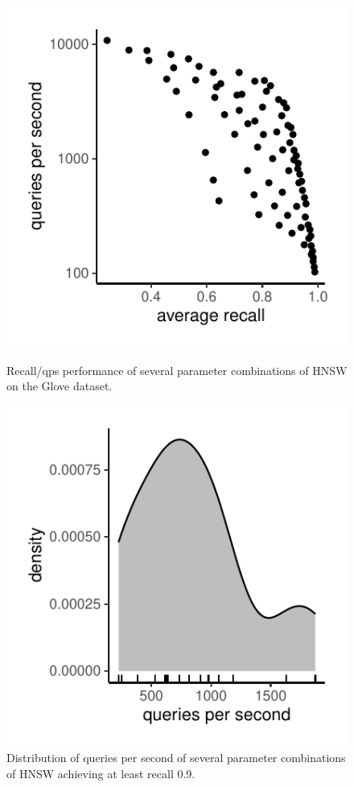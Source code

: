 \documentclass[11pt]{article}
\begin{document}
\begin{figure}
	\begin{minipage}{.4\textwidth}
		\includegraphics[width=\textwidth]{submissions/Matteo2023/figures/all_params.pdf}
		\caption{Recall/qps performance of several parameter combinations of
			HNSW on the Glove dataset.\label{matteo_fig:allparams}}
	\end{minipage}
	\hfill
	\begin{minipage}{.4\textwidth}
		\includegraphics[width=\textwidth]{submissions/Matteo2023/figures/distribution_qps.pdf}
		\caption{Distribution of queries per second of several parameter
			combinations of HNSW achieving at least recall
			0.9.\label{matteo_fig:distribution-qps}}
	\end{minipage}
\end{figure}
\end{document}
